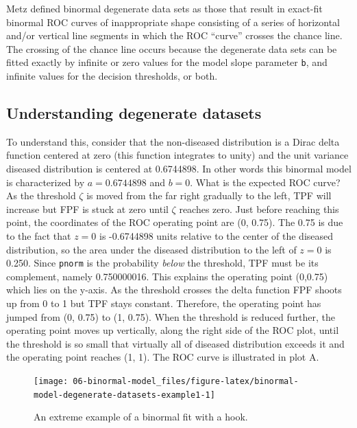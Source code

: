 \documentclass[
]{book}
\begin{document}
Metz defined binormal degenerate data sets as those that result in exact-fit binormal ROC curves of inappropriate shape consisting of a series of horizontal and/or vertical line segments in which the ROC ``curve'' crosses the chance line. The crossing of the chance line occurs because the degenerate data sets can be fitted exactly by infinite or zero values for the model slope parameter \texttt{b}, and infinite values for the decision thresholds, or both.

\hypertarget{binormal-model-understanding-degenerate-datasets}{%
\subsection{Understanding degenerate datasets}\label{binormal-model-understanding-degenerate-datasets}}

To understand this, consider that the non-diseased distribution is a Dirac delta function centered at zero (this function integrates to unity) and the unit variance diseased distribution is centered at 0.6744898. In other words this binormal model is characterized by \(a = 0.6744898\) and \(b = 0\). What is the expected ROC curve? As the threshold \(\zeta\) is moved from the far right gradually to the left, TPF will increase but FPF is stuck at zero until \(\zeta\) reaches zero. Just before reaching this point, the coordinates of the ROC operating point are (0, 0.75). The 0.75 is due to the fact that \(z = 0\) is -0.6744898 units relative to the center of the diseased distribution, so the area under the diseased distribution to the left of \(z = 0\) is 0.250. Since \texttt{pnorm} is the probability \emph{below} the threshold, TPF must be its complement, namely 0.750000016. This explains the operating point (0,0.75) which lies on the y-axis. As the threshold crosses the delta function FPF shoots up from 0 to 1 but TPF stays constant. Therefore, the operating point has jumped from (0, 0.75) to (1, 0.75). When the threshold is reduced further, the operating point moves up vertically, along the right side of the ROC plot, until the threshold is so small that virtually all of diseased distribution exceeds it and the operating point reaches (1, 1). The ROC curve is illustrated in plot A.

\begin{figure}

{\centering \texttt{[image: 06-binormal-model\_files/figure-latex/binormal-model-degenerate-datasets-example1-1]} 

}

\caption{An extreme example of a binormal fit with a hook.}\label{fig:binormal-model-degenerate-datasets-example1}
\end{figure}
\end{document}
